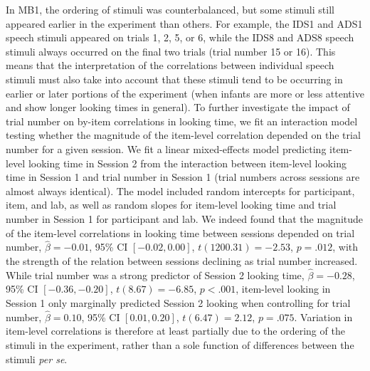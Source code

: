 \documentclass[
  man, donotrepeattitle,floatsintext]{apa6}
\begin{document}
In MB1, the ordering of stimuli was counterbalanced, but some stimuli still appeared earlier in the experiment than others. For example, the IDS1 and ADS1 speech stimuli appeared on trials 1, 2, 5, or 6, while the IDS8 and ADS8 speech stimuli always occurred on the final two trials (trial number 15 or 16). This means that the interpretation of the correlations between individual speech stimuli must also take into account that these stimuli tend to be occurring in earlier or later portions of the experiment (when infants are more or less attentive and show longer looking times in general). To further investigate the impact of trial number on by-item correlations in looking time, we fit an interaction model testing whether the magnitude of the item-level correlation depended on the trial number for a given session. We fit a linear mixed-effects model predicting item-level looking time in Session 2 from the interaction between item-level looking time in Session 1 and trial number in Session 1 (trial numbers across sessions are almost always identical). The model included random intercepts for participant, item, and lab, as well as random slopes for item-level looking time and trial number in Session 1 for participant and lab. We indeed found that the magnitude of the item-level correlations in looking time between sessions depended on trial number, \(\hat{\beta} = -0.01\), 95\% CI \([-0.02, 0.00]\), \(t(1200.31) = -2.53\), \(p = .012\), with the strength of the relation between sessions declining as trial number increased. While trial number was a strong predictor of Session 2 looking time, \(\hat{\beta} = -0.28\), 95\% CI \([-0.36, -0.20]\), \(t(8.67) = -6.85\), \(p < .001\), item-level looking in Session 1 only marginally predicted Session 2 looking when controlling for trial number, \(\hat{\beta} = 0.10\), 95\% CI \([0.01, 0.20]\), \(t(6.47) = 2.12\), \(p = .075\). Variation in item-level correlations is therefore at least partially due to the ordering of the stimuli in the experiment, rather than a sole function of differences between the stimuli \emph{per se}.
\end{document}
